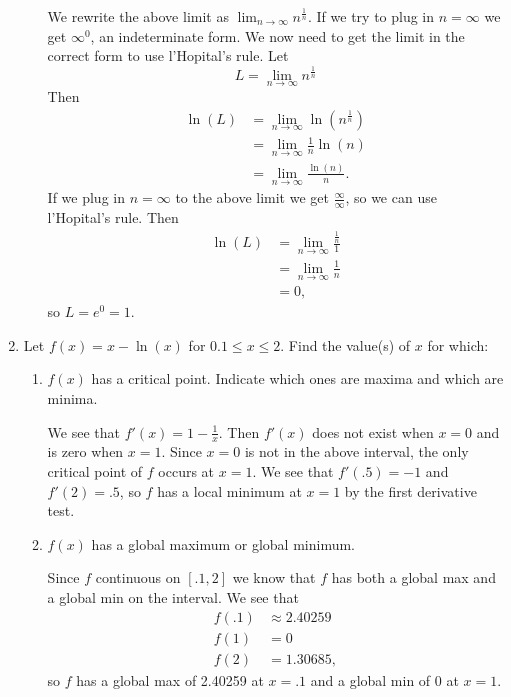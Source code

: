 \documentclass[11pt]{article}
\begin{document}
\begin{enumerate}
\begin{enumerate}
    \vfill
    {\color{blue}
    We rewrite the above limit as $\displaystyle\lim_{n\to
      \infty}n^{\frac{1}{n}}$. If we try to plug in $n=\infty$ we get
    $\infty^0$, an indeterminate form.  We now need to get the limit
    in the correct form to use l'Hopital's rule.  Let
    \[
    L = \displaystyle\lim_{n\to \infty}n^{\frac{1}{n}}
    \]
    Then
    \begin{align*}
      \ln(L) &= \lim_{n\to \infty}\ln\left(n^{\frac{1}{n}}\right)\\
      &= \lim_{n\to \infty}\frac{1}{n}\ln(n)\\
      &= \lim_{n\to \infty}\frac{\ln(n)}{n}.
    \end{align*}
    If we plug in $n=\infty$ to the above limit we get
    $\frac{\infty}{\infty}$, so we can use l'Hopital's rule.  Then
    \begin{align*}
      \ln(L) &= \lim_{n\to \infty} \frac{\frac{1}{n}}{1}\\
      &= \lim_{n\to\infty}\frac{1}{n}\\
      &= 0,
    \end{align*}
    so $L=e^0=1$.
    }
    \vfill
  \end{enumerate}
  \newpage


\item Let $f(x)=x-\ln(x)$ for $0.1\leq x\leq 2$. Find the value(s) of
  $x$ for which:
  \begin{enumerate}
  \item $f(x)$ has a critical point. Indicate which ones are maxima
    and which are minima.

    \vfill
    {\color{blue}    
      We see that $f'(x) = 1-\frac{1}{x}$.  Then $f'(x)$ does not exist
      when $x=0$ and is zero when $x=1$.  Since $x=0$ is not in the
      above interval, the only critical point of $f$ occurs at $x=1$.
      We see that $f'(.5)=-1$ and $f'(2)=.5$, so $f$ has a local minimum
      at $x=1$ by the first derivative test.
    }
    \vfill
    
  \item $f(x)$ has a global maximum or global minimum.

    \vfill
    
    {\color{blue}
    Since $f$ continuous on $[.1,2]$ we know that $f$ has both a
    global max and a global min on the interval.  We see that
    \begin{align*}
      f(.1) &\approx 2.40259\\
      f(1) &= 0\\
      f(2) &= 1.30685,
    \end{align*}
    so $f$ has a global max of 2.40259 at $x=.1$ and a global min of 0
    at $x=1$.
    }
    \vfill
  \end{enumerate}
  \newpage
  

\end{enumerate}
\end{document}
